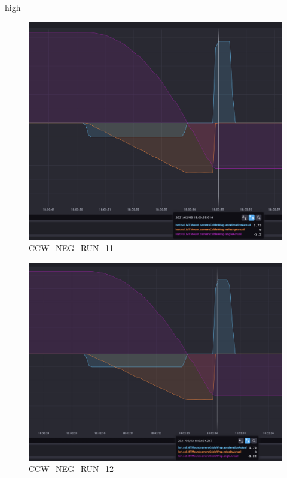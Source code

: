 high\documentclass[SE,lsstdraft,authoryear,toc]{lsstdoc}
\begin{document}
\begin{figure}[h!]
  \includegraphics[width=\linewidth]{media/CCW_design_speed_neg_test11.png}
  \caption{CCW\_NEG\_RUN\_11}
  \label{fig:CCW_NEG_RUN_11}
\end{figure}
\begin{figure}[h!]
  \includegraphics[width=\linewidth]{media/CCW_design_speed_neg_test12.png}
  \caption{CCW\_NEG\_RUN\_12}
  \label{fig:CCW_NEG_RUN_12}
\end{figure}
\end{document}
